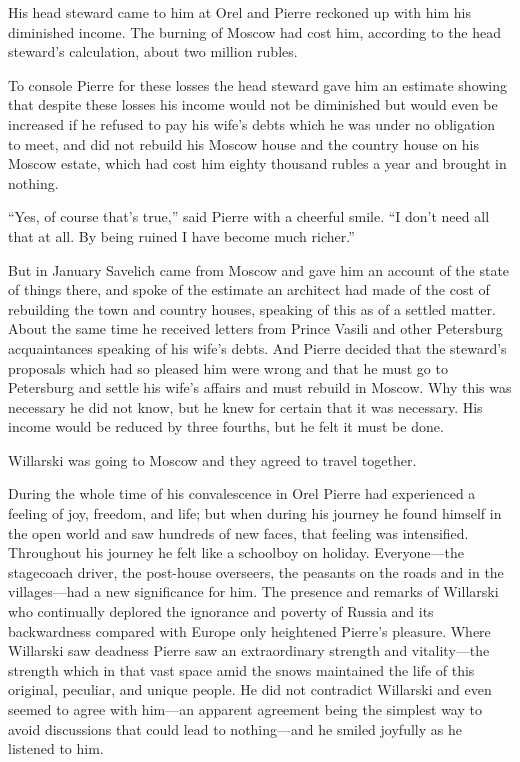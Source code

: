 His head steward came to him at Orel and Pierre reckoned up with
him his diminished income. The burning of Moscow had cost him,
according to the head steward's calculation, about two million
rubles.

To console Pierre for these losses the head steward gave him an
estimate showing that despite these losses his income would not
be diminished but would even be increased if he refused to pay
his wife's debts which he was under no obligation to meet, and
did not rebuild his Moscow house and the country house on his
Moscow estate, which had cost him eighty thousand rubles a year
and brought in nothing.

``Yes, of course that's true,'' said Pierre with a cheerful
smile. ``I don't need all that at all. By being ruined I have
become much richer.''

But in January Savelich came from Moscow and gave him an account
of the state of things there, and spoke of the estimate an
architect had made of the cost of rebuilding the town and country
houses, speaking of this as of a settled matter. About the same
time he received letters from Prince Vasili and other Petersburg
acquaintances speaking of his wife's debts. And Pierre decided
that the steward's proposals which had so pleased him were wrong
and that he must go to Petersburg and settle his wife's affairs
and must rebuild in Moscow. Why this was necessary he did not
know, but he knew for certain that it was necessary. His income
would be reduced by three fourths, but he felt it must be done.

Willarski was going to Moscow and they agreed to travel together.

During the whole time of his convalescence in Orel Pierre had
experienced a feeling of joy, freedom, and life; but when during
his journey he found himself in the open world and saw hundreds
of new faces, that feeling was intensified. Throughout his
journey he felt like a schoolboy on holiday. Everyone---the
stagecoach driver, the post-house overseers, the peasants on the
roads and in the villages---had a new significance for him. The
presence and remarks of Willarski who continually deplored the
ignorance and poverty of Russia and its backwardness compared
with Europe only heightened Pierre's pleasure.  Where Willarski
saw deadness Pierre saw an extraordinary strength and
vitality---the strength which in that vast space amid the snows
maintained the life of this original, peculiar, and unique
people. He did not contradict Willarski and even seemed to agree
with him---an apparent agreement being the simplest way to avoid
discussions that could lead to nothing---and he smiled joyfully
as he listened to him.

